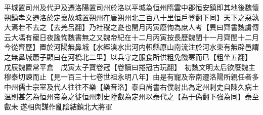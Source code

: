 平城置司州及代尹及遷洛陽置司州於洛以平城為恒州隋雲中郡恒安鎮即其地後魏懷朔鎮孝文遷洛於定襄故城置朔州在唐朔州北三百八十里恒戶登翻下同】天下之惡孰大焉若不去之【去羌呂翻】乃社稷之憂也閏月丙寅廢恂為庶人考【異曰齊書魏虜傳云大馮有寵日夜讒恂魏書無之又魏帝紀在十二月丙寅按長歷魏閏十一月齊閏十二月今從齊歷】置於河陽無鼻城【水經溴水出河内軹縣原山南流注於河水東有無辟邑謂之無鼻城蕭子顯曰在河橋北二里】以兵守之服食所供粗免饑寒而已【粗坐五翻】　戊辰魏置常平倉　戊寅太子寶卷冠【卷讀曰捲冠古玩翻】　初魏文明太后欲廢魏主穆泰切諫而止【見一百三十七卷世祖永明八年】由是有寵及帝南遷洛陽所親任者多中州儒士宗室及代人往往不樂【樂音洛】泰自尚書右僕射出為定州刺史自陳久病土温則甚乞為恒州帝為之徙恒州刺史陸叡為定州以泰代之【為于偽翻下強為同】泰至叡未遂相與謀作亂陰結鎮北大將軍